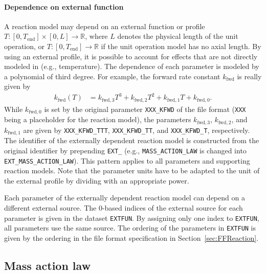 \paragraph{Dependence on external function}
\label{par:MRExternalFunctions}

A reaction model may depend on an external function or profile $T\colon \left[ 0, T_{\text{end}}\right] \times [0, L] \to \mathds{R}$, where $L$ denotes the physical length of the unit operation, or $T\colon \left[0, T_{\text{end}}\right] \to \mathds{R}$ if the unit operation model has no axial length. 
By using an external profile, it is possible to account for effects that are not directly modeled in \CADET{} (e.g., temperature).
The dependence of each parameter is modeled by a polynomial of third degree.
For example, the forward rate constant $k_{\text{fwd}}$ is really given by
\begin{align*}
  k_{\text{fwd}}(T) &= k_{\text{fwd},3} T^3 + k_{\text{fwd},2} T^2 + k_{\text{fwd},1} T + k_{\text{fwd},0}.
\end{align*}
While $k_{\text{fwd},0}$ is set by the original parameter \texttt{XXX\_KFWD} of the file format (\texttt{XXX} being a placeholder for the reaction model), the parameters $k_{\text{fwd},3}$, $k_{\text{fwd},2}$, and $k_{\text{fwd},1}$ are given by \texttt{XXX\_KFWD\_TTT}, \texttt{XXX\_KFWD\_TT}, and \texttt{XXX\_KFWD\_T}, respectively.
The identifier of the externally dependent reaction model is constructed from the original identifier by prepending \texttt{EXT\_} (e.g., \texttt{MASS\_ACTION\_LAW} is changed into \texttt{EXT\_MASS\_ACTION\_LAW}).
This pattern applies to all parameters and supporting reaction models.
Note that the parameter units have to be adapted to the unit of the external profile by dividing with an appropriate power.

Each parameter of the externally dependent reaction model can depend on a different external source.
The 0-based indices of the external source for each parameter is given in the dataset \texttt{EXTFUN}.
By assigning only one index to \texttt{EXTFUN}, all parameters use the same source.
The ordering of the parameters in \texttt{EXTFUN} is given by the ordering in the file format specification in Section~\ref{sec:FFReaction}.

\subsection{Mass action law}\label{sec:MRMassActionLaw}

